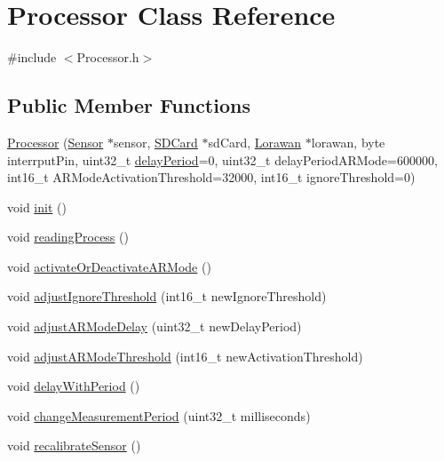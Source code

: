 \hypertarget{class_processor}{}\section{Processor Class Reference}
\label{class_processor}


{\ttfamily \#include $<$Processor.\+h$>$}

\subsection*{Public Member Functions}
\begin{DoxyCompactItemize}
\item 
\mbox{\hyperlink{class_processor_a9fdc4e6a92586eea32020a1f1e666ed6}{Processor}} (\mbox{\hyperlink{class_sensor}{Sensor}} $\ast$sensor, \mbox{\hyperlink{class_s_d_card}{S\+D\+Card}} $\ast$sd\+Card, \mbox{\hyperlink{class_lorawan}{Lorawan}} $\ast$lorawan, byte interrput\+Pin, uint32\+\_\+t \mbox{\hyperlink{class_processor_a3d4df57c57607d2ed3ad9f2d4ff3e789}{delay\+Period}}=0, uint32\+\_\+t delay\+Period\+A\+R\+Mode=600000, int16\+\_\+t A\+R\+Mode\+Activation\+Threshold=32000, int16\+\_\+t ignore\+Threshold=0)
\item 
void \mbox{\hyperlink{class_processor_a22e869ee49d974ad0ee7ee81961ab88f}{init}} ()
\item 
void \mbox{\hyperlink{class_processor_a694b889c3c6f8c09b998b4012d304d6e}{reading\+Process}} ()
\item 
void \mbox{\hyperlink{class_processor_a9316beb5903476939018dce45e992c53}{activate\+Or\+Deactivate\+A\+R\+Mode}} ()
\item 
void \mbox{\hyperlink{class_processor_a4b4e65040fd7bc17e978412c1af8e0c8}{adjust\+Ignore\+Threshold}} (int16\+\_\+t new\+Ignore\+Threshold)
\item 
void \mbox{\hyperlink{class_processor_a5b6762cf2679f4f47365aacb47b59ef5}{adjust\+A\+R\+Mode\+Delay}} (uint32\+\_\+t new\+Delay\+Period)
\item 
void \mbox{\hyperlink{class_processor_a58a2f6a482491cb003f4ff1bd45ba891}{adjust\+A\+R\+Mode\+Threshold}} (int16\+\_\+t new\+Activation\+Threshold)
\item 
void \mbox{\hyperlink{class_processor_a6ad79126a7694ed86f3f5ccc36b606bd}{delay\+With\+Period}} ()
\item 
void \mbox{\hyperlink{class_processor_a8759b7d9dc2d5f63fa9ca08f9211fd77}{change\+Measurement\+Period}} (uint32\+\_\+t milliseconds)
\item 
void \mbox{\hyperlink{class_processor_ae18acf2c55d0a3bcd7412f86d388808d}{recalibrate\+Sensor}} ()

\end{DoxyCompactItemize}
